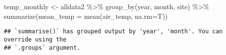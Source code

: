 \documentclass[
]{book}
\newenvironment{Shaded}{\begin{snugshade}}{\end{snugshade}}
\newcommand{\AttributeTok}[1]{\textcolor[rgb]{0.77,0.63,0.00}{#1}}
\newcommand{\FunctionTok}[1]{\textcolor[rgb]{0.00,0.00,0.00}{#1}}
\newcommand{\NormalTok}[1]{#1}
\newcommand{\OtherTok}[1]{\textcolor[rgb]{0.56,0.35,0.01}{#1}}
\newcommand{\SpecialCharTok}[1]{\textcolor[rgb]{0.00,0.00,0.00}{#1}}
\newcommand{\StringTok}[1]{\textcolor[rgb]{0.31,0.60,0.02}{#1}}
\begin{document}
\begin{Shaded}
\begin{Highlighting}[]
\NormalTok{temp\_monthly }\OtherTok{\textless{}{-}}\NormalTok{ alldata2 }\SpecialCharTok{\%\textgreater{}\%}
    \FunctionTok{group\_by}\NormalTok{(year, month, site) }\SpecialCharTok{\%\textgreater{}\%}
    \FunctionTok{summarize}\NormalTok{(}\AttributeTok{mean\_temp =} \FunctionTok{mean}\NormalTok{(}\StringTok{\textasciigrave{}}\AttributeTok{air\_temp}\StringTok{\textasciigrave{}}\NormalTok{, }\AttributeTok{na.rm=}\NormalTok{T))}
\end{Highlighting}
\end{Shaded}

\begin{verbatim}
## `summarise()` has grouped output by 'year', 'month'. You can override using the
## `.groups` argument.
\end{verbatim}
\end{document}
